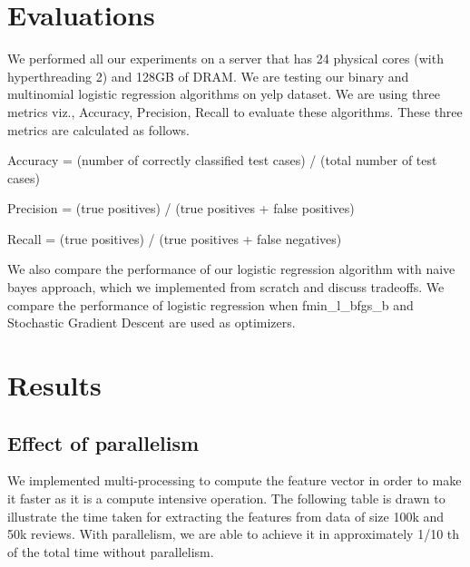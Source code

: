 \documentclass{article}
\begin{document}
\section{Evaluations}

We performed all our experiments on a server that has 24 physical cores (with hyperthreading 2) and 128GB of DRAM. We are testing our binary and multinomial logistic regression algorithms on yelp dataset. We are using three metrics viz., Accuracy, Precision, Recall to evaluate these algorithms. These three metrics are calculated as follows.


Accuracy = (number of correctly classified test cases) / (total number of test cases) 


Precision = (true positives) / (true positives + false positives)


Recall =  (true positives) / (true positives + false negatives)


We also compare the performance of our logistic regression algorithm with naive bayes approach, which we implemented from scratch and discuss tradeoffs. We compare the performance of logistic regression when fmin\_l\_bfgs\_b and Stochastic Gradient Descent are used as optimizers.

\section{Results}


\subsection{Effect of parallelism}
We implemented multi-processing to compute the feature vector in order to make it faster as it is a compute intensive operation. The following table is drawn to illustrate the time taken for extracting the features from data of size 100k and 50k reviews. With parallelism, we are able to achieve it in approximately 1/10 th of the total time without parallelism.
\end{document}
